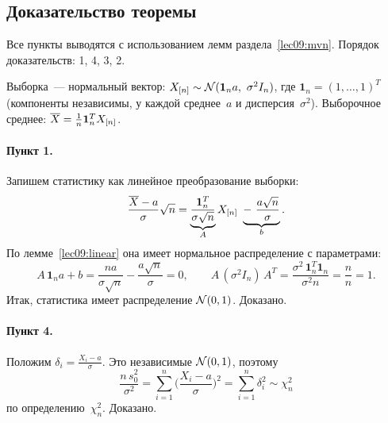 \subsection{Доказательство теоремы}
\label{lec09:proof}

Все пункты выводятся с использованием лемм раздела~\ref{lec09:mvn}. Порядок доказательств: 1, 4, 3, 2.

Выборка~--- нормальный вектор: $X_{[n]} \sim \mathcal{N}(\mathbf{1}_n a,\ \sigma^2 I_n)$, где
$\mathbf{1}_n = (1, \ldots, 1)^T$ (компоненты независимы, у каждой среднее~$a$ и
дисперсия~$\sigma^2$). Выборочное среднее: $\overline{X} = \frac1n \mathbf{1}_n^T X_{[n]}$.

\paragraph{Пункт 1.}
Запишем статистику как линейное преобразование выборки:
\[
  \frac{\overline{X} - a}{\sigma}\sqrt n
  = \underbrace{\frac{\mathbf{1}_n^T}{\sigma\sqrt n}}_{A} X_{[n]}
    \ \underbrace{-\ \frac{a\sqrt n}{\sigma}}_{b}.
\]
По лемме~\ref{lec09:linear} она имеет нормальное распределение с параметрами:
\[
  A\,\mathbf{1}_n a + b = \frac{n a}{\sigma\sqrt n} - \frac{a\sqrt n}{\sigma} = 0,
  \qquad
  A\,(\sigma^2 I_n)\,A^T = \frac{\sigma^2\, \mathbf{1}_n^T \mathbf{1}_n}{\sigma^2 n} = \frac{n}{n} = 1.
\]
Итак, статистика имеет распределение $\mathcal{N}(0, 1)$. Доказано.

\paragraph{Пункт 4.}
Положим $\delta_i = \frac{X_i - a}{\sigma}$. Это независимые $\mathcal{N}(0, 1)$, поэтому
\[
  \frac{n\, s_0^2}{\sigma^2} = \sum_{i=1}^n \biggl(\frac{X_i - a}{\sigma}\biggr)^2 = \sum_{i=1}^n \delta_i^2 \sim \chi^2_n
\]
по определению~$\chi^2_n$. Доказано.

